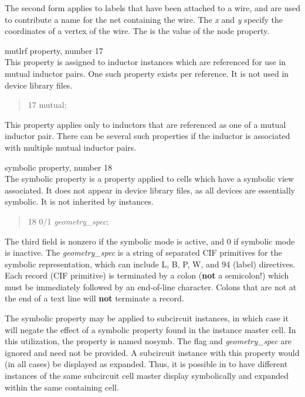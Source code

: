 \begin{description}
The second form applies to labels that have been attached to a wire,
and are used to contribute a name for the net containing the wire. 
The {\it x} and {\it y} specify the coordinates of a vertex of the
wire.  The {} is the value of the {\et node} property.

\item{\et mutlrf} property, number 17\\
This property is assigned to inductor instances which are referenced
for use in mutual inductor pairs.  One such property exists per
reference.  It is not used in device library files.
\begin{quote} 17 mutual;
\end{quote}
This property applies only to inductors that are referenced as one of
a mutual inductor pair.  There can be several such properties if the
inductor is associated with multiple mutual inductor pairs.

\item{\et symbolic} property, number 18\\
The {\et symbolic} property is a property applied to cells which have
a symbolic view associated.  It does not appear in device library
files, as all devices are essentially symbolic.  It is not inherited by
instances.
\begin{quote} 18 0/1 {\it geometry\_spec};
\end{quote}
The third field is nonzero if the symbolic mode is active, and 0
if symbolic mode is inactive.  The {\it geometry\_spec} is a string of
separated CIF primitives for the symbolic representation, which can
include L, B, P, W, and 94 (label) directives.  Each record (CIF
primitive) is terminated by a colon ({\bf not} a semicolon!) which
must be immediately followed by an end-of-line character.  Colons that
are not at the end of a text line will {\bf not} terminate a record.

The {\et symbolic} property may be applied to subcircuit instances, in
which case it will negate the effect of a {\et symbolic} property
found in the instance master cell.  In this utilization, the property
is named {\cb nosymb}.  The flag and {\it geometry\_spec} are ignored
and need not be provided.  A subcircuit instance with this property
would (in all cases) be displayed as expanded.  Thus, it is possible
in {\Xic} to have different instances of the same subcircuit cell
master display symbolically and expanded within the same containing
cell.


\end{description}
